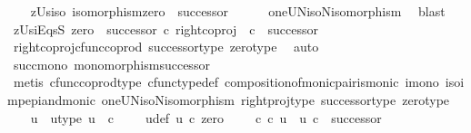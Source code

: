 \begin{isabellebody}
\ \ \isamarkupfalse%
\ zUs{\isacharunderscore}{\kern0pt}iso{\isacharcolon}{\kern0pt}\ {\isachardoublequoteopen}isomorphism{\isacharparenleft}{\kern0pt}zero\ {\isasymamalg}\ successor{\isacharparenright}{\kern0pt}{\isachardoublequoteclose}\isanewline
\ \ \ \ \isamarkupfalse%
\ oneUN{\isacharunderscore}{\kern0pt}iso{\isacharunderscore}{\kern0pt}N{\isacharunderscore}{\kern0pt}isomorphism\ \isamarkupfalse%
\ blast\isanewline
\ \ \isamarkupfalse%
\ zUsi{}EqsS{\isacharcolon}{\kern0pt}\ {\isachardoublequoteopen}{\isacharparenleft}{\kern0pt}zero\ {\isasymamalg}\ successor{\isacharparenright}{\kern0pt}\ {\isasymcirc}\isactrlsub c\ {\isacharparenleft}{\kern0pt}right{\isacharunderscore}{\kern0pt}coproj\ {\isasymone}\ {\isasymnat}\isactrlsub c{\isacharparenright}{\kern0pt}\ {\isacharequal}{\kern0pt}\ successor{\isachardoublequoteclose}\isanewline
\ \ \ \ \isamarkupfalse%
\ right{\isacharunderscore}{\kern0pt}coproj{\isacharunderscore}{\kern0pt}cfunc{\isacharunderscore}{\kern0pt}coprod\ successor{\isacharunderscore}{\kern0pt}type\ zero{\isacharunderscore}{\kern0pt}type\ \isamarkupfalse%
\ auto\isanewline
\ \ \isamarkupfalse%
\ \isamarkupfalse%
\ succ{\isacharunderscore}{\kern0pt}mono{\isacharcolon}{\kern0pt}\ {\isachardoublequoteopen}monomorphism{\isacharparenleft}{\kern0pt}successor{\isacharparenright}{\kern0pt}{\isachardoublequoteclose}\isanewline
\ \ \ \ \isamarkupfalse%
\ {\isacharparenleft}{\kern0pt}metis\ cfunc{\isacharunderscore}{\kern0pt}coprod{\isacharunderscore}{\kern0pt}type\ cfunc{\isacharunderscore}{\kern0pt}type{\isacharunderscore}{\kern0pt}def\ composition{\isacharunderscore}{\kern0pt}of{\isacharunderscore}{\kern0pt}monic{\isacharunderscore}{\kern0pt}pair{\isacharunderscore}{\kern0pt}is{\isacharunderscore}{\kern0pt}monic\ i{}{\isacharunderscore}{\kern0pt}mono\ iso{\isacharunderscore}{\kern0pt}imp{\isacharunderscore}{\kern0pt}epi{\isacharunderscore}{\kern0pt}and{\isacharunderscore}{\kern0pt}monic\ oneUN{\isacharunderscore}{\kern0pt}iso{\isacharunderscore}{\kern0pt}N{\isacharunderscore}{\kern0pt}isomorphism\ right{\isacharunderscore}{\kern0pt}proj{\isacharunderscore}{\kern0pt}type\ successor{\isacharunderscore}{\kern0pt}type\ zero{\isacharunderscore}{\kern0pt}type{\isacharparenright}{\kern0pt}\isanewline
\ \ \isamarkupfalse%
\ u\ \ u{\isacharunderscore}{\kern0pt}type{\isacharcolon}{\kern0pt}\ {\isachardoublequoteopen}u{\isacharcolon}{\kern0pt}\ \ {\isasymnat}\isactrlsub c\ \ {\isasymrightarrow}\ {\isasymOmega}{\isachardoublequoteclose}\ \ u{\isacharunderscore}{\kern0pt}def{\isacharcolon}{\kern0pt}\ {\isachardoublequoteopen}u\ {\isasymcirc}\isactrlsub c\ zero\ {\isacharequal}{\kern0pt}\ {\isasymt}\ \ {\isasymand}\ {\isacharparenleft}{\kern0pt}{\isasymf}{\isasymcirc}\isactrlsub c{\isasymbeta}\isactrlbsub {\isasymOmega}\isactrlesub {\isacharparenright}{\kern0pt}\ {\isasymcirc}\isactrlsub c\ u\ {\isacharequal}{\kern0pt}\ u\ {\isasymcirc}\isactrlsub c\ \ successor{\isachardoublequoteclose}\isanewline

\end{isabellebody}
